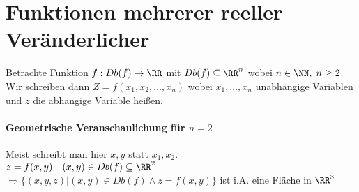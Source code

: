 \section{Funktionen mehrerer reeller Veränderlicher}
Betrachte Funktion $f: Db(f) \to \RR$ mit $Db(f)\subseteq \RR^n$ wobei $n\in \NN, \; n\geq 2$. Wir schreiben dann $Z=f(x_1, x_2, \dots, x_n)$ wobei $x_1, \dots, x_n$ unabhängige Variablen und $z$ die abhängige Variable heißen.
\paragraph{Geometrische Veranschaulichung für $n=2$} Meist schreibt man hier $x,y$ statt $x_1, x_2$.\\
$z=f(x,y) \quad (x,y) \in Db(f) \subseteq \RR^2$\\
$\Rightarrow \{(x,y,z) | (x,y) \in Db(f) \wedge z = f(x,y)\}$ ist i.A. eine Fläche in $\RR^3$
